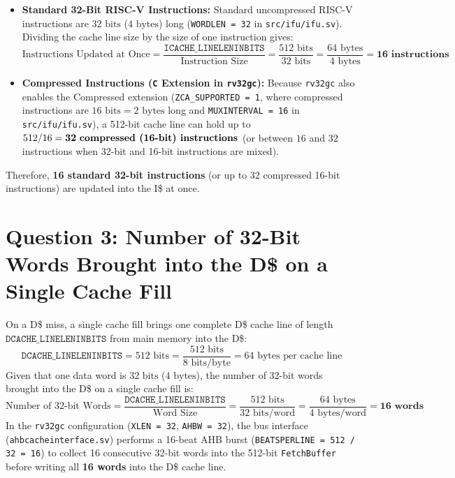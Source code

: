 \documentclass[11pt,a4paper]{article}
\begin{document}
\begin{itemize}[leftmargin=1.4em, itemsep=3.5pt, topsep=2pt]
    \item \textbf{Standard 32-Bit RISC-V Instructions:} Standard uncompressed RISC-V instructions are $32\text{ bits}$ ($4\text{ bytes}$) long (\texttt{WORDLEN = 32} in \texttt{src/ifu/ifu.sv}). Dividing the cache line size by the size of one instruction gives:
    \[
    \text{Instructions Updated at Once} = \frac{\texttt{ICACHE\_LINELENINBITS}}{\text{Instruction Size}} = \frac{512\text{ bits}}{32\text{ bits}} = \frac{64\text{ bytes}}{4\text{ bytes}} = \mathbf{16\text{ instructions}}
    \]
    \item \textbf{Compressed Instructions (\texttt{C} Extension in \texttt{rv32gc}):} Because \texttt{rv32gc} also enables the Compressed extension (\texttt{ZCA\_SUPPORTED = 1}, where compressed instructions are $16\text{ bits} = 2\text{ bytes}$ long and \texttt{MUXINTERVAL = 16} in \texttt{src/ifu/ifu.sv}), a 512-bit cache line can hold up to $512 / 16 = \mathbf{32}\text{ \textbf{compressed (16-bit) instructions}}$ (or between $16$ and $32$ instructions when 32-bit and 16-bit instructions are mixed).
\end{itemize}
Therefore, \textbf{16 standard 32-bit instructions} (or up to 32 compressed 16-bit instructions) are updated into the I\$ at once.


\section{Question 3: Number of 32-Bit Words Brought into the D\$ on a Single Cache Fill}

On a D\$ miss, a single cache fill brings one complete D\$ cache line of length $\texttt{DCACHE\_LINELENINBITS}$ from main memory into the D\$:
\[
\texttt{DCACHE\_LINELENINBITS} = 512\text{ bits} = \frac{512\text{ bits}}{8\text{ bits/byte}} = 64\text{ bytes per cache line}
\]
Given that one data word is $32\text{ bits}$ ($4\text{ bytes}$), the number of 32-bit words brought into the D\$ on a single cache fill is:
\[
\text{Number of 32-bit Words} = \frac{\texttt{DCACHE\_LINELENINBITS}}{\text{Word Size}} = \frac{512\text{ bits}}{32\text{ bits/word}} = \frac{64\text{ bytes}}{4\text{ bytes/word}} = \mathbf{16\text{ words}}
\]
In the \texttt{rv32gc} configuration (\texttt{XLEN = 32}, \texttt{AHBW = 32}), the bus interface (\texttt{ahbcacheinterface.sv}) performs a 16-beat AHB burst (\texttt{BEATSPERLINE = 512 / 32 = 16}) to collect 16 consecutive 32-bit words into the 512-bit \texttt{FetchBuffer} before writing all \textbf{16 words} into the D\$ cache line.
\end{document}
